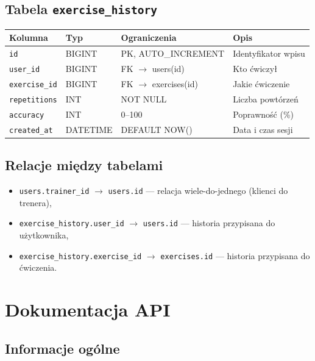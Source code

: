 \documentclass[12pt,a4paper]{article}
\begin{document}
\subsection{Tabela \texttt{exercise\_history}}

\begin{center}
\begin{tabular}{llll}
  \toprule
  \textbf{Kolumna} & \textbf{Typ} & \textbf{Ograniczenia} & \textbf{Opis} \\
  \midrule
  \texttt{id}           & BIGINT   & PK, AUTO\_INCREMENT        & Identyfikator wpisu \\
  \texttt{user\_id}     & BIGINT   & FK $\rightarrow$ users(id) & Kto ćwiczył \\
  \texttt{exercise\_id} & BIGINT   & FK $\rightarrow$ exercises(id) & Jakie ćwiczenie \\
  \texttt{repetitions}  & INT      & NOT NULL                   & Liczba powtórzeń \\
  \texttt{accuracy}     & INT      & 0--100                     & Poprawność (\%) \\
  \texttt{created\_at}  & DATETIME & DEFAULT NOW()              & Data i czas sesji \\
  \bottomrule
\end{tabular}
\end{center}

\subsection{Relacje między tabelami}

\begin{itemize}
  \item \texttt{users.trainer\_id} $\rightarrow$ \texttt{users.id} --- relacja wiele-do-jednego (klienci do trenera),
  \item \texttt{exercise\_history.user\_id} $\rightarrow$ \texttt{users.id} --- historia przypisana do użytkownika,
  \item \texttt{exercise\_history.exercise\_id} $\rightarrow$ \texttt{exercises.id} --- historia przypisana do ćwiczenia.
\end{itemize}

\section{Dokumentacja API}

\subsection{Informacje ogólne}
\end{document}
